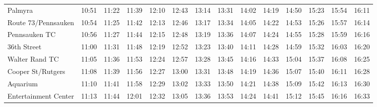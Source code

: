 \begin{center}
\begin{tabular}{@{}lrrrrrrrrrrrrr@{}}
Palmyra & 10:51 & 11:22 & 11:39 & 12:10 & 12:43 & 13:14 & 13:31 & 14:02 & 14:19 & 14:50 & 15:23 & 15:54 & 16:11 \\
Route 73/Pennsauken & 10:54 & 11:25 & 11:42 & 12:13 & 12:46 & 13:17 & 13:34 & 14:05 & 14:22 & 14:53 & 15:26 & 15:57 & 16:14 \\
Pennsauken TC & 10:56 & 11:27 & 11:44 & 12:15 & 12:48 & 13:19 & 13:36 & 14:07 & 14:24 & 14:55 & 15:28 & 15:59 & 16:16 \\
36th Street & 11:00 & 11:31 & 11:48 & 12:19 & 12:52 & 13:23 & 13:40 & 14:11 & 14:28 & 14:59 & 15:32 & 16:03 & 16:20 \\
Walter Rand TC & 11:05 & 11:36 & 11:53 & 12:24 & 12:57 & 13:28 & 13:45 & 14:16 & 14:33 & 15:04 & 15:37 & 16:08 & 16:25 \\
Cooper St/Rutgers & 11:08 & 11:39 & 11:56 & 12:27 & 13:00 & 13:31 & 13:48 & 14:19 & 14:36 & 15:07 & 15:40 & 16:11 & 16:28 \\
Aquarium & 11:10 & 11:41 & 11:58 & 12:29 & 13:02 & 13:33 & 13:50 & 14:21 & 14:38 & 15:09 & 15:42 & 16:13 & 16:30 \\
Entertainment Center & 11:13 & 11:44 & 12:01 & 12:32 & 13:05 & 13:36 & 13:53 & 14:24 & 14:41 & 15:12 & 15:45 & 16:16 & 16:33 \\
\bottomrule\end{tabular}\end{center}
